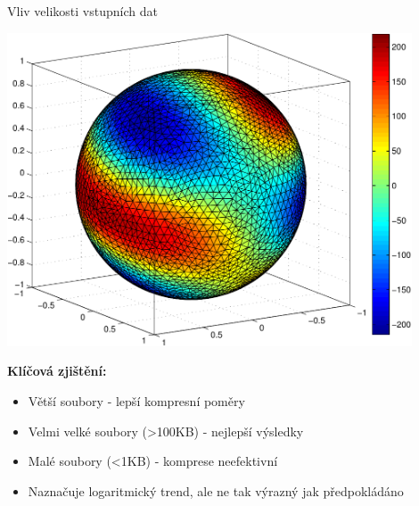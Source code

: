 \documentclass[lualatex,hyperref={pdfencoding=auto}]{beamer}
\begin{document}
\begin{frame}{Vliv velikosti vstupních dat}
  \begin{center}
    \includegraphics[width=0.9\textwidth]{fig/sphere_mix_real.pdf}
  \end{center}
  \vspace{3mm}
  \textbf{Klíčová zjištění:}
  \begin{itemize}
    \item Větší soubory - lepší kompresní poměry
    \item Velmi velké soubory (>100KB) - nejlepší výsledky
    \item Malé soubory (<1KB) - komprese neefektivní
    \item Naznačuje logaritmický trend, ale ne tak výrazný jak předpokládáno
  \end{itemize}
\end{frame}
\end{document}
